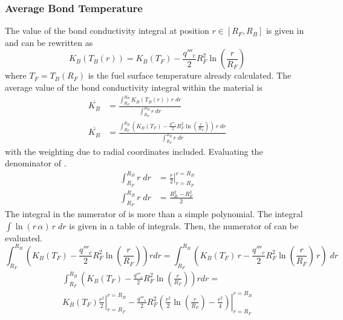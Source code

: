     \subsubsection{Average Bond Temperature}
      \label{sec:average_bond_temp}
      The value of the bond conductivity integral at position $r \in [R_F,R_B]$
      is given in  and can be rewritten as
      \begin{equation}
        K_B(T_B(r)) = K_B(T_F) - \frac{q'''_c}{2} R_F^2
          \ln\left(\frac{r}{R_F}\right)
      \end{equation}
      where $T_F=T_B(R_F)$ is the fuel surface temperature already calculated.
      The average value of the bond conductivity integral within the material is 
      \begin{align}
        \overline{K_B} &= \frac{\int_{R_F}^{R_B} K_B(T_B(r)) \, r \; dr}
          {\int_{R_F}^{R_B} r \; dr} \\
        \label{eq:kb_integral}
        \overline{K_B} &= \frac{\int_{R_F}^{R_B} \left( K_B(T_F) -
          \frac{q'''_c}{2} R_F^2 \ln\left(\frac{r}{R_F}\right) \right) \, r \;
          dr} {\int_{R_F}^{R_B} r \; dr}
      \end{align}
      with the weighting due to radial coordinates included.
      Evaluating the denominator of .
      \begin{align}
        \int_{R_F}^{R_B} r \; dr &= \left. \frac{r}{2} \right|_{r=R_F}^{r=R_B}\\
        \label{eq:kb_denominator}
        \int_{R_F}^{R_B} r \; dr &= \frac{R_B^2 - R_F^2}{2}
      \end{align}
      The integral in the numerator of  is more than a
      simple polynomial. The integral $\int \ln(r \, \alpha) \, r \; dr$ is given
      in a table of integrals. Then, the numerator of  can
      be evaluated. 
      \begin{equation}
        \int_{R_F}^{R_B} \left( K_B(T_F) - \frac{q'''_c}{2} R_F^2
          \ln\left(\frac{r}{R_F}\right) \right) r dr 
          = \int_{R_F}^{R_B}
          \left( K_B(T_F) \, r - \frac{q'''_c}{2}R_F^2
          \ln\left(\frac{r}{R_F}\right) \, r \right) \; dr
      \end{equation}
      \begin{multline}
        \int_{R_F}^{R_B} \left( K_B(T_F) - \frac{q'''_c}{2} R_F^2
          \ln\left(\frac{r}{R_F}\right) \right) r dr =\\
        \left. K_B(T_F) \frac{r^2}{2} \right|_{r=R_F}^{r=R_B} - 
          \left. \frac{q'''_c}{2}R_F^2 \left( \frac{r^2}{2}
          \ln\left(\frac{r}{R_F}\right) - \frac{r^2}{4} \right)
          \right|_{r=R_F}^{r=R_B}
      \end{multline}
